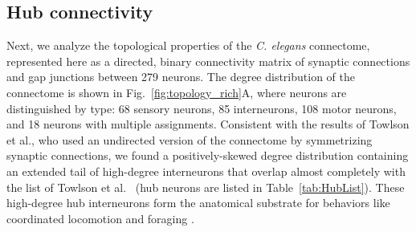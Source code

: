 \documentclass[10pt,letterpaper]{article}
\begin{document}


\subsection*{Hub connectivity}



Next, we analyze the topological properties of the \emph{C. elegans} connectome, represented here as a directed, binary connectivity matrix of synaptic connections and gap junctions between 279 neurons.
The degree distribution of the connectome is shown in Fig.~\ref{fig:topology_rich}A, where neurons are distinguished by type: 68 sensory neurons, 85 interneurons, 108 motor neurons, and 18 neurons with multiple assignments.
Consistent with the results of Towlson et al., who used an undirected version of the connectome by symmetrizing synaptic connections, we found a positively-skewed degree distribution containing an extended tail of high-degree interneurons that overlap almost completely with the list of Towlson et al.~\cite{Towlson:2013gf} (hub neurons are listed in Table~\ref{tab:HubList}).
These high-degree hub interneurons form the anatomical substrate for behaviors like coordinated locomotion and foraging \cite{tsalik2003}.
\end{document}

